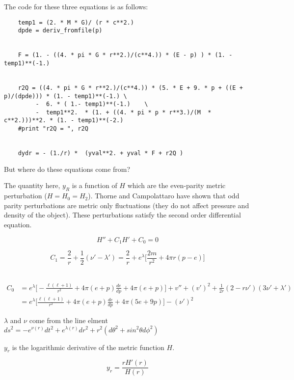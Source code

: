 \documentclass[11pt]{article}
\numberwithin{equation}{section}
\begin{document}
The code for these three equations is as follows:

\begin{lstlisting}
    temp1 = (2. * M * G)/ (r * c**2.)
    dpde = deriv_fromfile(p)


    F = (1. - ((4. * pi * G * r**2.)/(c**4.)) * (E - p) ) * (1. - temp1)**(-1.)


    r2Q = ((4. * pi * G * r**2.)/(c**4.)) * (5. * E + 9. * p + ((E + p)/(dpde))) * (1. - temp1)**(-1.) \
         -  6. * ( 1.- temp1)**(-1.)    \
         -  temp1**2.  * (1. + ((4. * pi * p * r**3.)/(M  * c**2.)))**2. * (1. - temp1)**(-2.)
    #print "r2Q = ", r2Q


    dydr = - (1./r) *  (yval**2. + yval * F + r2Q ) 

\end{lstlisting}

But where do these equations come from?

The quantity here, $y_R$ is a function of $H$ which are the even-parity metric perturbation ($H=H_0=H_2$). Thorne and Campolattaro have shown that odd parity perturbations are metric only fluctuations (they do not affect pressure and density of the object). These perturbations satisfy the second order differential equation.

\begin{equation}
H'' + C_{1} H' + C_{0} = 0
\end{equation}

\begin{equation}
C_1 = \frac{2}{r} + \frac{1}{2} (\nu' -\lambda') = \frac{2}{r} + e^{\lambda} \bigg[ \frac{2m}{r^2} + 4 \pi r (p - e) \bigg]
\end{equation}\

\begin{align}
C_0 & = e^{\lambda} \bigg[ - \frac{\ell (\ell+ 1)}{r^2} + 4 \pi (e + p) \frac{de}{dp} + 4 \pi (e + p)    \bigg] + v'' + (v')^2 + \frac{1}{2 r} (2-r \nu ')(3 \nu' + \lambda') \\
	& = e^{\lambda}  \bigg[ \frac{\ell (\ell+ 1)}{r^2} + 4 \pi (e + p) \frac{de}{dp}  + 4 \pi (5e + 9p)  \bigg]  - (\nu')^{2} \nonumber 
\end{align}

$\lambda$ and $\nu$ come from the line elment $ds^2 = -e^{\nu(r)} dt^2 + e^{\lambda (r)} dr^2 + r^2 (d \theta^{2} + sin^{2} \theta d \phi^{2})$

$y_{r}$ is the logarithmic derivative of the metric function $H$.

\begin{equation}
y_r = \frac{r H'(r)}{H(r)}
\end{equation}
\end{document}
